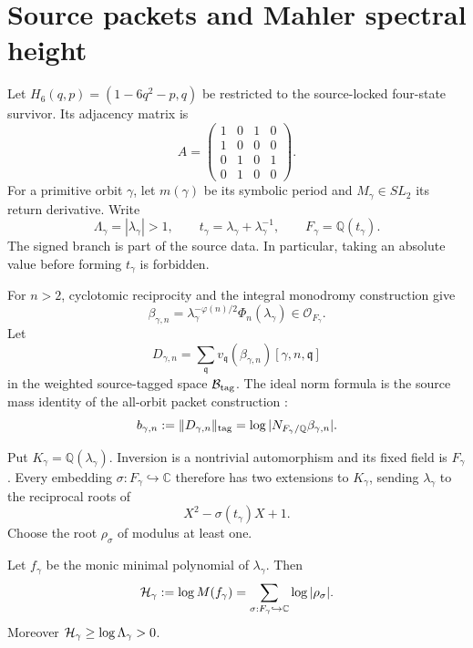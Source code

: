 \section{Source packets and Mahler spectral height}

Let $H_6(q,p)=(1-6q^2-p,q)$ be restricted to the source-locked four-state
survivor.  Its adjacency matrix is
\[
 A=\begin{pmatrix}
 1&0&1&0\\
 1&0&0&0\\
 0&1&0&1\\
 0&1&0&0
 \end{pmatrix}.
\]
For a primitive orbit $\gamma$, let $m(\gamma)$ be its symbolic period and
$M_\gamma\in SL_2$ its return derivative.  Write
\[
 \Lambda_\gamma=|\lambda_\gamma|>1,
 \qquad t_\gamma=\lambda_\gamma+\lambda_\gamma^{-1},
 \qquad F_\gamma=\mathbb Q(t_\gamma).
\]
The signed branch is part of the source data.  In particular, taking an
absolute value before forming $t_\gamma$ is forbidden.

For $n>2$, cyclotomic reciprocity and the integral monodromy construction
give \citep{WangP49}
\begin{equation}
 \beta_{\gamma,n}
 =\lambda_\gamma^{-\varphi(n)/2}\Phi_n(\lambda_\gamma)
 \in\mathcal O_{F_\gamma}.
 \label{eq:beta}
\end{equation}
Let
\[
 D_{\gamma,n}
 =\sum_{\mathfrak q}v_{\mathfrak q}(\beta_{\gamma,n})
 [\gamma,n,\mathfrak q]
\]
in the weighted source-tagged space $\mathcal B_{\mathrm{tag}}$.  The ideal norm formula is
the source mass identity of the all-orbit packet construction
\citep{WangP51}:
\begin{equation}
 b_{\gamma,n}:=\|D_{\gamma,n}\|_{\rm tag}
 =\log|N_{F_\gamma/\mathbb Q}\beta_{\gamma,n}|.
 \label{eq:mass}
\end{equation}

Put $K_\gamma=\mathbb Q(\lambda_\gamma)$.  Inversion is a nontrivial
automorphism and its fixed field is $F_\gamma$.  Every embedding
$\sigma:F_\gamma\hookrightarrow\mathbb C$ therefore has two extensions to
$K_\gamma$, sending $\lambda_\gamma$ to the reciprocal roots of
\[
 X^2-\sigma(t_\gamma)X+1.
\]
Choose the root $\rho_\sigma$ of modulus at least one.

\begin{lemma}
Let $f_\gamma$ be the monic minimal polynomial of
$\lambda_\gamma$.  Then
\begin{equation}
 \mathcal H_\gamma:=\log M(f_\gamma)
 =\sum_{\sigma:F_\gamma\hookrightarrow\mathbb C}
 \log|\rho_\sigma|.
 \label{eq:height}
\end{equation}
Moreover $\mathcal H_\gamma\ge\log\Lambda_\gamma>0$.
\end{lemma}


